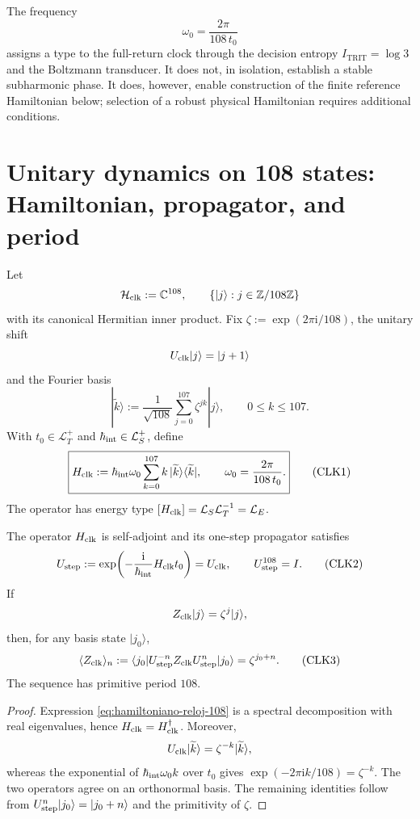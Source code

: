 The frequency
\[
 \omega_0=\frac{2\pi}{108\,t_0}
\]
assigns a type to the full-return clock through the decision entropy
\(I_{\mathrm{TRIT}}=\log 3\) and the Boltzmann transducer.
It does not, in isolation, establish a stable subharmonic phase. It does, however, enable construction of
the finite reference Hamiltonian below; selection of a robust physical
Hamiltonian requires additional conditions.

\section{Unitary dynamics on 108 states: Hamiltonian, propagator, and period}
\label{sec:hamiltoniano-reloj-108}

Let
\[
 \mathcal H_{\rm clk}:=\mathbb C^{108},
 \qquad
 \{|j\rangle:j\in\mathbb Z/108\mathbb Z\}
\]
with its canonical Hermitian inner product. Fix
\(\zeta:=\exp(2\pi\mathrm i/108)\), the unitary shift
\[
 U_{\rm clk}|j\rangle=|j+1\rangle
\]
and the Fourier basis
\[
 |\widetilde k\rangle
 :=\frac1{\sqrt{108}}\sum_{j=0}^{107}\zeta^{jk}|j\rangle,
 \qquad 0\leq k\leq107.
\]
With \(t_0\in\mathcal L_T^+\) and
\(\hbar_{\rm int}\in\mathcal L_S^+\), define
\[
 \boxed{
 H_{\rm clk}
 :=\hbar_{\rm int}\omega_0
 \sum_{k=0}^{107}k\,
 |\widetilde k\rangle\langle\widetilde k|,
 \qquad
 \omega_0=\frac{2\pi}{108\,t_0}.}
 \tag{CLK1}\label{eq:hamiltoniano-reloj-108}
\]
The operator has energy type
\([H_{\rm clk}]=\mathcal L_S\mathcal L_T^{-1}=\mathcal L_E\).

\begin{theorem}
\label{thm:reloj-unitario-108}
The operator \(H_{\rm clk}\) is self-adjoint and its one-step propagator
satisfies
\[
 U_{\rm step}
 :=\exp\!\left(-\frac{\mathrm i}{\hbar_{\rm int}}
 H_{\rm clk}t_0\right)
 =U_{\rm clk},
 \qquad
 U_{\rm step}^{108}=I.
 \tag{CLK2}\label{eq:propagador-reloj-108}
\]
If
\[
 Z_{\rm clk}|j\rangle=\zeta^j|j\rangle,
\]
then, for any basis state \(|j_0\rangle\),
\[
 \langle Z_{\rm clk}\rangle_{n}
 :=\langle j_0|U_{\rm step}^{-n}Z_{\rm clk}
 U_{\rm step}^n|j_0\rangle
 =\zeta^{j_0+n}.
 \tag{CLK3}\label{eq:respuesta-reloj-108}
\]
The sequence has primitive period \(108\).
\end{theorem}

\begin{proof}
Expression \eqref{eq:hamiltoniano-reloj-108} is a spectral
decomposition with real eigenvalues, hence \(H_{\rm clk}=H_{\rm clk}^\dagger\).
Moreover,
\[
 U_{\rm clk}|\widetilde k\rangle
 =\zeta^{-k}|\widetilde k\rangle,
\]
whereas the exponential of
\(\hbar_{\rm int}\omega_0 k\) over \(t_0\) gives
\(\exp(-2\pi\mathrm ik/108)=\zeta^{-k}\). The two operators agree on
an orthonormal basis. The remaining identities follow from
\(U_{\rm step}^n|j_0\rangle=|j_0+n\rangle\) and the primitivity of
\(\zeta\).
\end{proof}

